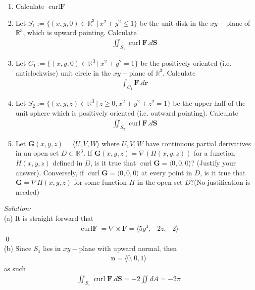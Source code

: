 \documentclass[12pt]{article}
\begin{document}
\begin{enumerate}[label=\alph*)]
    \item Calculate $\operatorname{curl }\textbf{F}$
    \item Let $S_1:=\{(x,y,0)\in\mathbb{R}^3\ |\ x^2+y^2\leq 1\}$ be the unit disk in the $xy-$plane of $\mathbb{R}^3$, which is upward pointing. Calculate
    \begin{align*}
        \iint_{S_1}\operatorname{curl }\textbf{F}.d\textbf{S}
    \end{align*}
    \item Let $C_1:=\{(x,y,0)\in\mathbb{R}^3\ |\ x^2+y^2=1\}$ be the positively oriented (i.e. anticlockwise) unit circle in the $xy-$plane of $\mathbb{R}^3$. Calculate
    \begin{align*}
        \int_{C_1}\textbf{F}.d\textbf{r}
    \end{align*}
    \item Let $S_2:=\{(x,y,z)\in\mathbb{R}^3\ |\ z\geq 0, x^2+y^2+z^2=1\}$ be the upper half of the unit sphere which is positively oriented (i.e. outward pointing). Calculate
    \begin{align*}
        \iint_{S_2} \operatorname{curl }\textbf{F}.d\textbf{S}
    \end{align*}
    \item Let $\textbf{G}(x,y,z)=\langle U,V,W\rangle$ where $U,V,W$ have continuous partial derivatives in an open set $D\subset\mathbb{R}^3$. If $\textbf{G}(x,y,z)=\nabla(H(x,y,z))$ for a function $H(x,y,z)$ defined in $D$, is it true that $\operatorname{curl }\textbf{G}=\langle 0,0,0\rangle$? (Justify your answer). Conversely, if $\operatorname{curl}\textbf{G}=\langle0,0,0\rangle$ at every point in $D$, is it true that $\textbf{G}=\nabla H(x,y,z)$ for some function $H$ in the open set $D$?(No justification is needed)
\end{enumerate}
\emph{Solution:}\\
(a) It is straight forward that
\begin{align*}
    \operatorname{curl \textbf{F}}=\nabla\times \textbf{F}=\langle 5y^4,-2z,-2\rangle
\end{align*}\qed\\[2em]
(b) Since $S_1$ lies in $xy-$plane with upward normal, then
\begin{align*}
    \textbf{n}=\langle 0,0,1\rangle
\end{align*}
as such
\begin{align*}
    \iint_{S_1}\operatorname{curl }\textbf{F}.d\textbf{S}=-2\iint dA=-2\pi
\end{align*}
\end{document}
